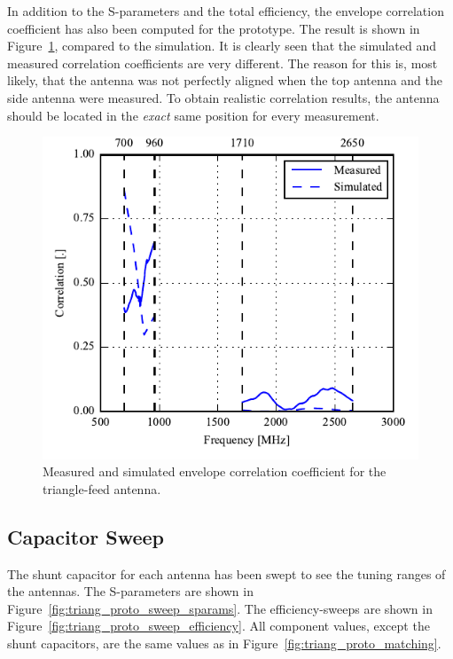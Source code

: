 In addition to the S-parameters and the total efficiency, the envelope correlation coefficient has also been computed for the prototype. The result is shown in Figure~\ref{fig:triang_proto_ecc}, compared to the simulation. It is clearly seen that the simulated and measured correlation coefficients are very different. The reason for this is, most likely, that the antenna was not perfectly aligned when the top antenna and the side antenna were measured. To obtain realistic correlation results, the antenna should be located in the \emph{exact} same position for every measurement.

\begin{figure}[htbp]
    \centering
    \includegraphics{img/tech_sol/trianglefeed/mockup/best_correlation.pdf}
    \caption{Measured and simulated envelope correlation coefficient for the triangle-feed antenna.}
    \label{fig:triang_proto_ecc}
\end{figure}

\subsection{Capacitor Sweep}
The shunt capacitor for each antenna has been swept to see the tuning ranges of the antennas. The S-parameters are shown in Figure~\ref{fig:triang_proto_sweep_sparams}. The efficiency-sweeps are shown in Figure~\ref{fig:triang_proto_sweep_efficiency}. All component values, except the shunt capacitors, are the same values as in Figure~\ref{fig:triang_proto_matching}.


